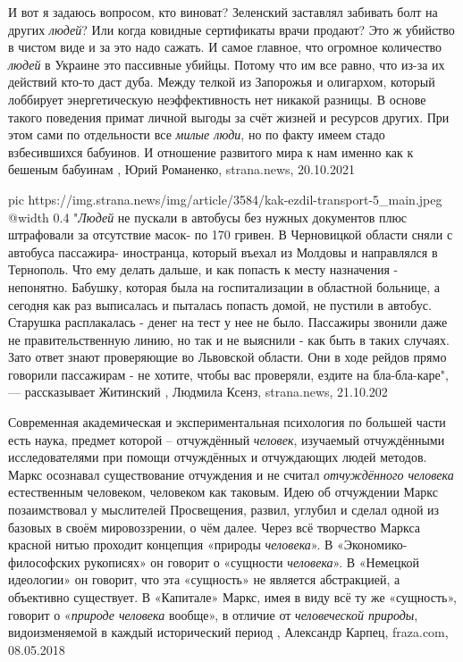 И вот я задаюсь вопросом, кто виноват? Зеленский заставлял забивать болт на
других \emph{людей}? Или когда ковидные сертификаты врачи продают? Это ж
убийство в чистом виде и за это надо сажать. И самое главное, что огромное
количество \emph{людей} в Украине это пассивные убийцы. Потому что им все
равно, что из-за их действий кто-то даст дуба. Между телкой из Запорожья и
олигархом, который лоббирует энергетическую неэффективность нет никакой
разницы. В основе такого поведения примат личной выгоды за счёт жизней и
ресурсов других.  При этом сами по отдельности все \emph{милые люди}, но по
факту имеем стадо взбесившихся бабуинов. И отношение развитого мира к нам
именно как к бешеным бабуинам
, 
Юрий Романенко, strana.news, 20.10.2021

\ifcmt
  pic https://img.strana.news/img/article/3584/kak-ezdil-transport-5_main.jpeg
  @width 0.4
\fi
"\emph{Людей} не пускали в автобусы без нужных документов плюс штрафовали за
отсутствие масок- по 170 гривен. В Черновицкой области сняли с автобуса
пассажира- иностранца, который въехал из Молдовы и направлялся в Тернополь. Что
ему делать дальше, и как попасть к месту назначения - непонятно. Бабушку,
которая была на госпитализации в областной больнице, а сегодня как раз
выписалась и пыталась попасть домой, не пустили в автобус. Старушка
расплакалась - денег на тест у нее не было. Пассажиры звонили даже не
правительственную линию, но так и не выяснили - как быть в таких случаях. Зато
ответ знают проверяющие во Львовской области. Они в ходе рейдов прямо говорили
пассажирам - не хотите, чтобы вас проверяли, ездите на бла-бла-каре", —
рассказывает Житинский
, Людмила Ксенз, strana.news, 21.10.202

Современная академическая и экспериментальная психология по большей части есть
наука, предмет которой – отчуждённый \emph{человек}, изучаемый отчуждёнными
исследователями при помощи отчуждённых и отчуждающих людей методов. Маркс
осознавал существование отчуждения и не считал \emph{отчуждённого человека}
естественным человеком, человеком как таковым. Идею об отчуждении Маркс
позаимствовал у мыслителей Просвещения, развил, углубил и сделал одной из
базовых в своём мировоззрении, о чём далее.  Через всё творчество Маркса
красной нитью проходит концепция «природы \emph{человека}». В
«Экономико-философских рукописях» он говорит о «сущности \emph{человека}». В
«Немецкой идеологии» он говорит, что эта «сущность» не является абстракцией, а
объективно существует. В «Капитале» Маркс, имея в виду всё ту же «сущность»,
говорит о «\emph{природе человека} вообще», в отличие от \emph{человеческой
природы}, видоизменяемой в каждый исторический период
, 
Александр Карпец, fraza.com, 08.05.2018

